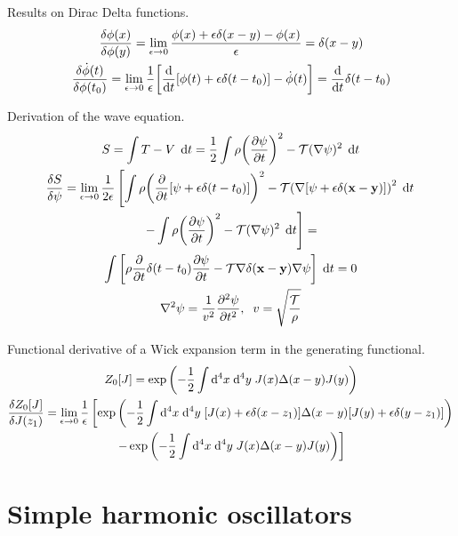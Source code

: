 \documentclass{report}
\begin{document}
\begin{subquests}
 	\item Results on Dirac Delta functions.
 	\begin{gather*}
		\fdv{\phi(x)}{\phi(y)} = \lim_{\epsilon \to 0} \frac{\phi(x) + \epsilon\delta(x-y) - \phi(x)}{\epsilon} = \delta(x-y) \\
		\fdv{\dot{\phi}(t)}{\phi(t_0)} = \lim_{\epsilon\to 0} \frac{1}{\epsilon}\bqty{\dv{t}[\phi(t) + \epsilon\delta(t - t_0)] - \dot{\phi}(t)} = \dv{t}\delta(t-t_0) 
	\end{gather*}

	\item Derivation of the wave equation. 
	\begin{gather*}
		S = \int T - V \;\dd{t} = \frac{1}{2}\int \rho\pqty{\pdv{\psi}{t}}^2 - \mathcal T(\nabla\psi)^2\;\dd{t} \\
		\fdv{S}{\psi} = \lim_{\epsilon \to 0}\frac{1}{2\epsilon}\left[\int\rho\pqty{\pdv{t}[\psi + \epsilon\delta(t-t_0)]}^2 - \mathcal T\pqty{\nabla[\psi + \epsilon\delta({\vb x} - {\vb y})]}^2 \;\dd{t} \right. \\ 
		\left. - \int \rho\pqty{\pdv{\psi}{t}}^2 - \mathcal T(\nabla\psi)^2\;\dd{t} \right] = \\
		\int\bqty{\rho\pdv{t}\delta(t-t_0)\pdv{\psi}{t} - \mathcal T\nabla\delta({\vb x}-{\vb y})\nabla\psi}\;\dd{t} = 0 \\
		\nabla^2 \psi = \frac{1}{v^2}\pdv[2]{\psi}{t},\;\; v = \sqrt{\frac{\cal{T}}{\rho}}    
	\end{gather*}

	\item Functional derivative of a Wick expansion term in the generating functional.
	\begin{gather*}
		Z_0[J] = \exp\pqty{-\frac{1}{2}\int\dd^4{x}\;\dd^4{y}\;J(x)\Delta(x-y)J(y)} \\
		\fdv{Z_0[J]}{J(z_1)} = \lim_{\epsilon \to 0} \frac{1}{\epsilon}\left[\exp\pqty{-\frac{1}{2}\int\dd^4{x}\;\dd^4{y}\;\bqty{J(x) + \epsilon \delta(x - z_1)}\Delta(x-y)\bqty{J(y) + \epsilon \delta(y - z_1)}} \right. \\
		\left. - \exp\pqty{-\frac{1}{2}\int\dd^4{x}\;\dd^4{y}\;J(x)\Delta(x-y)J(y)}\right]
	\end{gather*}
\end{subquests}
	

\chapter{Simple harmonic oscillators}
\end{document}
